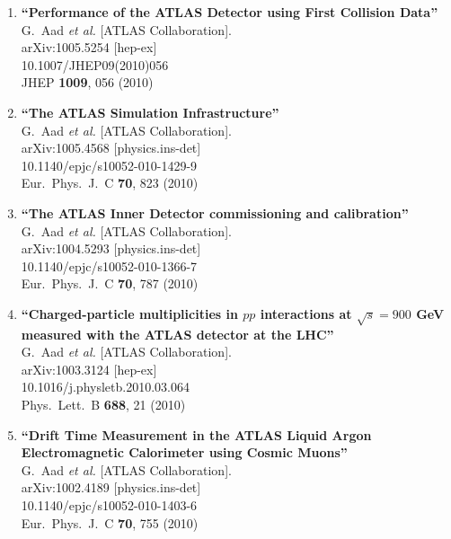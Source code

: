 \documentclass{article}
\begin{document}
\begin{enumerate}
\item%
{\bf ``Performance of the ATLAS Detector using First Collision Data''}
  \\{}G.~Aad {\it et al.}  [ATLAS Collaboration].
  \\{}arXiv:1005.5254 [hep-ex]
    \\{}10.1007/JHEP09(2010)056
\\{}JHEP {\bf 1009}, 056 (2010) %


\item%
{\bf ``The ATLAS Simulation Infrastructure''}
  \\{}G.~Aad {\it et al.}  [ATLAS Collaboration].
  \\{}arXiv:1005.4568 [physics.ins-det]
    \\{}10.1140/epjc/s10052-010-1429-9
\\{}Eur.\ Phys.\ J.\ C {\bf 70}, 823 (2010) %


\item%
{\bf ``The ATLAS Inner Detector commissioning and calibration''}
  \\{}G.~Aad {\it et al.}  [ATLAS Collaboration].
  \\{}arXiv:1004.5293 [physics.ins-det]
    \\{}10.1140/epjc/s10052-010-1366-7
\\{}Eur.\ Phys.\ J.\ C {\bf 70}, 787 (2010) %


\item%
{\bf ``Charged-particle multiplicities in $pp$ interactions at $\sqrt{s}=900$ GeV measured with the ATLAS detector at the LHC''}
  \\{}G.~Aad {\it et al.}  [ATLAS Collaboration].
  \\{}arXiv:1003.3124 [hep-ex]
    \\{}10.1016/j.physletb.2010.03.064
\\{}Phys.\ Lett.\ B {\bf 688}, 21 (2010) %


\item%
{\bf ``Drift Time Measurement in the ATLAS Liquid Argon Electromagnetic Calorimeter using Cosmic Muons''}
  \\{}G.~Aad {\it et al.}  [ATLAS Collaboration].
  \\{}arXiv:1002.4189 [physics.ins-det]
    \\{}10.1140/epjc/s10052-010-1403-6
\\{}Eur.\ Phys.\ J.\ C {\bf 70}, 755 (2010) %



\end{enumerate}
\end{document}
